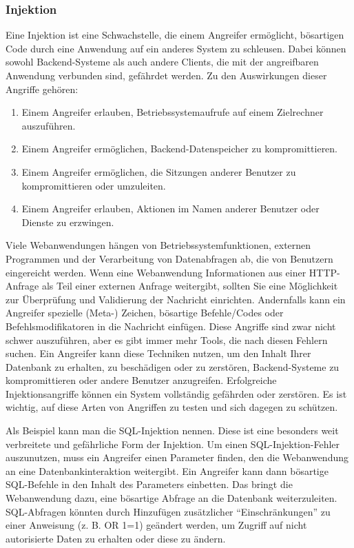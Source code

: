 \subsubsection{Injektion}

Eine Injektion ist eine Schwachstelle, die einem Angreifer ermöglicht,
bösartigen Code durch eine Anwendung auf ein anderes System zu
schleusen. Dabei können sowohl Backend-Systeme als auch andere
Clients, die mit der angreifbaren Anwendung verbunden sind, gefährdet
werden. Zu den Auswirkungen dieser Angriffe gehören:

\begin{enumerate}
    \item Einem Angreifer erlauben, Betriebssystemaufrufe auf einem
    Zielrechner auszuführen.
    \item Einem Angreifer ermöglichen, Backend-Datenspeicher
    zu kompromittieren.
    \item Einem Angreifer ermöglichen, die Sitzungen anderer
    Benutzer zu kompromittieren oder umzuleiten.
    \item Einem Angreifer erlauben, Aktionen im Namen anderer
    Benutzer oder Dienste zu erzwingen.
\end{enumerate}

Viele Webanwendungen hängen von Betriebssystemfunktionen, externen
Programmen und der Verarbeitung von Datenabfragen ab, die von
Benutzern eingereicht werden. Wenn eine Webanwendung Informationen
aus einer HTTP-Anfrage als Teil einer externen Anfrage weitergibt,
sollten Sie eine Möglichkeit zur Überprüfung und Validierung der
Nachricht einrichten. Andernfalls kann ein Angreifer spezielle
(Meta-) Zeichen, bösartige Befehle/Codes oder Befehlsmodifikatoren in
die Nachricht einfügen. Diese Angriffe sind zwar nicht schwer
auszuführen, aber es gibt immer mehr Tools, die nach diesen
Fehlern suchen. Ein Angreifer kann diese Techniken nutzen, um den
Inhalt Ihrer Datenbank zu erhalten, zu beschädigen oder zu zerstören,
Backend-Systeme zu kompromittieren oder andere Benutzer anzugreifen.
Erfolgreiche Injektionsangriffe können ein System vollständig
gefährden oder zerstören. Es ist wichtig, auf diese Arten von
Angriffen zu testen und sich dagegen zu schützen.

Als Beispiel kann man die SQL-Injektion nennen. Diese ist eine
besonders weit verbreitete und gefährliche Form der Injektion.
Um einen SQL-Injektion-Fehler auszunutzen, muss ein Angreifer
einen Parameter finden, den die Webanwendung an eine
Datenbankinteraktion weitergibt. Ein Angreifer kann dann
bösartige SQL-Befehle in den Inhalt des Parameters einbetten.
Das bringt die Webanwendung dazu, eine bösartige Abfrage an die
Datenbank weiterzuleiten. SQL-Abfragen könnten durch Hinzufügen
zusätzlicher ``Einschränkungen'' zu einer Anweisung (z. B. OR 1=1)
geändert werden, um Zugriff auf nicht autorisierte Daten zu
erhalten oder diese zu ändern.



